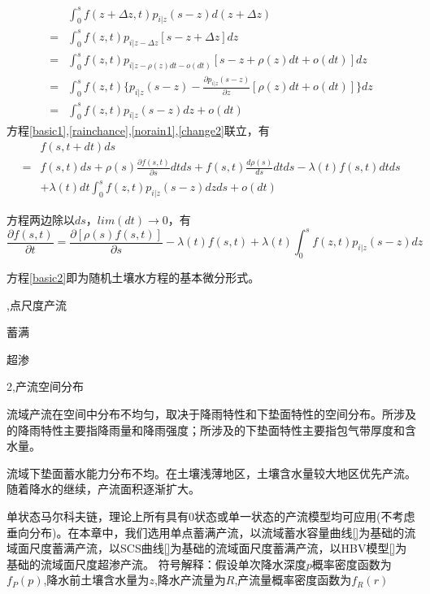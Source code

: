\begin{equation}
\label{change2}
\begin{split}
&\int_{0}^{s} f(z+\Delta z,t)p_{i|z}(s-z)d(z+\Delta z)\\
=&\int_{0}^{s} f(z,t)p_{i|z-\Delta z}[s-z+\Delta z]dz\\
=&\int_{0}^{s} f(z,t)p_{i|z-\rho(z)dt-o(dt)}[s-z+\rho(z)dt+o(dt)]dz\\
 =&\int_{0}^{s} f(z,t)\lbrace p_{i|z}(s-z)-\frac{\partial p_{i|z}(s-z)}{\partial z}[\rho(z)dt+o(dt)]\rbrace dz\\
 =&\int_{0}^{s} f(z,t)p_{i|z}(s-z)dz+o(dt)
 \end{split}
\end{equation}
\fi
方程\ref{basic1},\ref{rainchance},\ref{norain1},\ref{change2}联立，有
\begin{equation}
\begin{split}
 &f(s,t+dt)ds\\=&f(s,t)ds+\rho(s)\frac{\partial{f(s,t)}}{\partial s}dtds+f(s,t)\frac{d\rho(s)}{ds}dtds-\lambda(t)f(s,t)dtds\\&+\lambda(t)dt\int_{0}^{s} f(z,t)p_{i|z}(s-z)dzds+o(dt)
 \end{split}
 \end{equation}

方程两边除以$ds$，$lim(dt)\rightarrow0$，有
 \begin{equation}
\label{basic2}
 \frac{\partial{f(s,t)}}{\partial t}=\frac{\partial{[\rho(s)f(s,t)]}}{\partial s}-\lambda(t)f(s,t)+\lambda(t)\int_{0}^{s} f(z,t)p_{i|z}(s-z)dz
 \end{equation}

方程\ref{basic2}即为随机土壤水方程的基本微分形式。
\fi

,点尺度产流

蓄满

超渗

2,产流空间分布

流域产流在空间中分布不均匀，取决于降雨特性和下垫面特性的空间分布\cite{ruixiaofang}。所涉及的降雨特性主要指降雨量和降雨强度；所涉及的下垫面特性主要指包气带厚度和含水量。

流域下垫面蓄水能力分布不均。在土壤浅薄地区，土壤含水量较大地区优先产流。随着降水的继续，产流面积逐渐扩大。

单状态马尔科夫链，理论上所有具有0状态或单一状态的产流模型均可应用(不考虑垂向分布)。在本章中，我们选用单点蓄满产流，以流域蓄水容量曲线\ref{}为基础的流域面尺度蓄满产流，以SCS曲线\ref{}为基础的流域面尺度蓄满产流，以HBV模型\ref{}为基础的流域面尺度超渗产流。
符号解释：假设单次降水深度$p$概率密度函数为$f_P(p)$,降水前土壤含水量为$z$,降水产流量为$R$,产流量概率密度函数为$f_R(r)$





